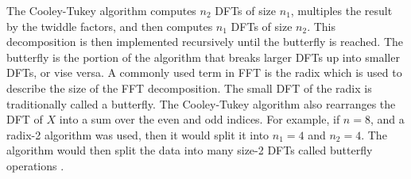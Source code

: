             The Cooley-Tukey algorithm computes $n_2$ DFTs of size $n_1$, multiples the
            result by the twiddle factors, and then computes $n_1$ DFTs of size
            $n_2$. This decomposition is then implemented recursively until the
            butterfly is reached. 
            The butterfly is the portion of the algorithm 
            that breaks larger DFTs up into smaller
            DFTs, or vise versa.
            A commonly used term
            in FFT is the radix which is used to describe the size of the
            FFT decomposition.
            The small DFT of the radix is traditionally called a butterfly. The
            Cooley-Tukey algorithm also rearranges the DFT of $X$ into a sum over the even
            and odd indices.
            For example, if $n=8$, and a radix-2 algorithm was used, then it would split it
            into $n_1=4$ and $n_2=4$. The algorithm would then split the data into many
            size-2 DFTs called butterfly operations \cite{frigo2005design}.
%
%
%

